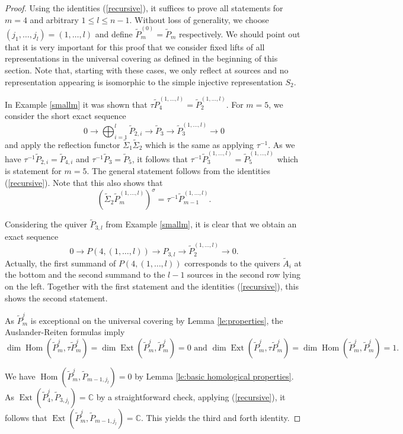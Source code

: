 \documentclass{amsart}
\newcommand{\uj}{\underline j}
\newcommand{\CC}{\mathbb{C}}
\newcommand{\Ext}{\operatorname{Ext}}
\newcommand{\Hom}{\operatorname{Hom}}
\newcommand{\ses}[3]{0\rightarrow #1\rightarrow #2\rightarrow#3\rightarrow 0}
\begin{document}
\begin{proof}
Using the identities (\ref{recursive}), it suffices to prove all statements for $m=4$ and arbitrary $1\leq l\leq n-1$. Without loss of generality, we choose $(j_1,\ldots,j_l)=(1,\ldots,l)$ and define $\tilde P_m^{(0)}=\tilde P_m$ respectively. We should point out that it is very important for this proof that we consider fixed lifts of all representations in the universal covering as defined in the beginning of this section. Note that, starting with these cases, we only reflect at sources and no representation appearing is isomorphic to the simple injective representation $S_2$.  


In Example \ref{smallm} it was shown that $\tau \tilde P_4^{(1,\ldots,l)}=\tilde P_2^{(1,\ldots,l)}$. For $m=5$,  we consider the short exact sequence
\[\ses{\bigoplus_{i=1}^l\tilde P_{2,i}}{\tilde P_3}{\tilde P_3^{(1,\ldots,l)}}\]
and apply the reflection functor $\tilde\Sigma_1\tilde\Sigma_2$ which is the same as applying $\tau^{-1}$. As we have $\tau^{-1} \tilde P_{2,i}=\tilde P_{4,i}$ and $\tau^{-1}\tilde P_3=\tilde P_5$, it follows that $\tau^{-1}\tilde P_3^{(1,\ldots,l)}=\tilde P_5^{(1,\ldots,l)}$ which is statement for $m=5$. The general statement follows from the identities (\ref{recursive}). Note that this also shows that
\[(\tilde \Sigma_2\tilde P_{m}^{(1,\ldots,l)})^\sigma=\tau^{-1}\tilde P^{(1,\ldots,l)}_{m-1}.\]


Considering the quiver $\tilde P_{3,l}$ from Example \ref{smallm}, it is clear that we obtain an exact sequence
$$\ses{P(4,(1,\ldots,l))}{P_{3,l}}{\tilde P_2^{(1,\ldots,l)}}.$$
Actually, the first summand of $P(4,(1,\ldots,l))$ corresponds to the quivers $\tilde A_i$ at the bottom and the second summand to the $l-1$ sources in the second row lying on the left. Together with the first statement and the identities (\ref{recursive}), this shows the second statement.

As $\tilde P_m^{\uj}$ is exceptional on the universal covering by Lemma \ref{le:properties}, the Auslander-Reiten formulas \cite[Theorem IV.2.13]{ass} imply 
$$\dim\Hom(\tilde P_{m}^{\uj},\tau \tilde P_{m}^{\uj})=\dim\Ext(\tilde P_{m}^{\uj},\tilde P_{m}^{\uj})=0 \text{ and } \dim\Ext(\tilde P_m^{\uj},\tau\tilde P_m^{j})=\dim\Hom(\tilde P_{m}^{\uj},\tilde P_{m}^{\uj})=1.$$

We have $\Hom(\tilde P_{m}^{\uj},\tilde P_{m-1,j_l})=0$ by Lemma \ref{le:basic homological properties}. As $\Ext(\tilde P_{4}^{\uj},\tilde P_{3,j_l})=\CC$ by a straightforward check, applying (\ref{recursive}), it follows that $\Ext(\tilde P_{m}^{\uj},\tilde P_{m-1,j_l})=\CC$. This yields the third and forth identity.




\end{proof}
\end{document}
